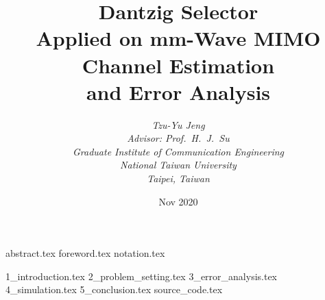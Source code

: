 \documentclass [a4paper, 12pt, twoside, openright] {book}
\begin{document}
\title{
   \textbf {Dantzig Selector} \\ \bigskip
   \textbf {Applied on mm-Wave MIMO} \\ \bigskip
   \textbf {Channel Estimation} \\ \bigskip
   \textbf {and Error Analysis}
}
\author{
   {\it Tzu-Yu Jeng} \\ \bigskip
   {\it Advisor: Prof.\ H.\ J.\ Su} \\ \bigskip
   {\it Graduate Institute of Communication Engineering} \\ \bigskip
   {\it National Taiwan University} \\ \bigskip
   {\it Taipei, Taiwan}
}
{\date{Nov 2020}}

\hypersetup {pageanchor = false}

\maketitle

\frontmatter
 {abstract.tex}
 {foreword.tex}
 {notation.tex}
\tableofcontents
\listoffigures

\hypersetup {pageanchor = true}

\mainmatter

 {1_introduction.tex}
 {2_problem_setting.tex}
 {3_error_analysis.tex}
 {4_simulation.tex}
 {5_conclusion.tex}
 {source_code.tex}

\printbibliography
\end{document}
